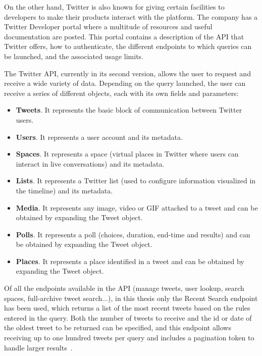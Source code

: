 \nonzeroparskip On the other hand, Twitter is also known for giving certain facilities to developers to make their products interact with the platform. The company has a Twitter Developer portal where a multitude of resources and useful documentation are posted\cite{twitter_dev}. This portal contains a description of the API that Twitter offers, how to authenticate, the different endpoints to which queries can be launched, and the associated usage limits. 

\nonzeroparskip The Twitter API, currently in its second version, allows the user to request and receive a wide variety of data. Depending on the query launched, the user can receive a series of different objects, each with its own fields and parameters:
\begin{itemize}
	\item \textbf{Tweets}. It represents the basic block of communication between Twitter users.
	\item \textbf{Users}. It represents a user account and its metadata.
	\item \textbf{Spaces}. It represents a space (virtual places in Twitter where users can interact in live conversations) and its metadata.
	\item \textbf{Lists}. It represents a Twitter list (used to configure information visualized in the timeline) and its metadata.
	\item \textbf{Media}. It represents any image, video or GIF attached to a tweet and can be obtained by expanding the Tweet object.
	\item \textbf{Polls}. It represents a poll (choices, duration, end-time and results) and can be obtained by expanding the Tweet object.
	\item \textbf{Places}. It represents a place identified in a tweet and can be obtained by expanding the Tweet object.
\end{itemize}

\nonzeroparskip Of all the endpoints available in the API (manage tweets, user lookup, search spaces, full-archive tweet search...), in this thesis only the Recent Search endpoint has been used, which returns a list of the most recent tweets based on the rules entered in the query. Both the number of tweets to receive and the id or date of the oldest tweet to be returned can be specified, and this endpoint allows receiving up to one hundred tweets per query and includes a pagination token to handle larger results~\cite{twitter_dev_searchtweets}.

